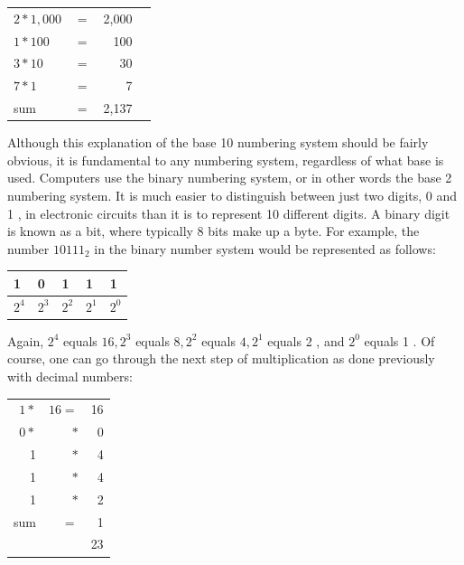 \documentclass[10pt]{book}
\begin{document}
\begin{center}
\begin{center}
\begin{center}
\begin{center}
\begin{center}
\begin{center}
\begin{tabular}{llrr}
$2 * 1,000$ & $=$ & 2,000 \\
$1 * 100$ & $=$ & 100 \\
$3 * 10$ & $=$ & 30 \\
$7 * 1$ & $=$ & 7 \\
\hline
sum & $=$ & 2,137 \\
\hline
\end{tabular}
\end{center}

Although this explanation of the base 10 numbering system should be fairly obvious, it is fundamental to any numbering system, regardless of what base is used. Computers use the binary numbering system, or in other words the base 2 numbering system. It is much easier to distinguish between just two digits, 0 and 1 , in electronic circuits than it is to represent 10 different digits. A binary digit is known as a bit, where typically 8 bits make up a byte. For example, the number $10111_{2}$ in the binary number system would be represented as follows:

\begin{center}
\begin{tabular}{|l|l|l|l|l|}
\hline
1 & 0 & 1 & 1 & 1 \\
\hline
$2^{4}$ & $2^{3}$ & $2^{2}$ & $2^{1}$ & $2^{0}$ \\
\hline
\end{tabular}
\end{center}

Again, $2^{4}$ equals $16,2^{3}$ equals $8,2^{2}$ equals $4,2^{1}$ equals 2 , and $2^{0}$ equals 1 . Of course, one can go through the next step of multiplication as done previously with decimal numbers:

\begin{center}
\begin{tabular}{rrr}
$1 *$ & $16=$ & 16 \\
$0 *$ & $*$ & 0 \\
1 & $*$ & 4 \\
1 & $*$ & 4 \\
1 & $*$ & 2 \\
\hline
sum & $=$ & 1 \\
\hline
 &  & 23 \\
\hline
\end{tabular}
\end{center}


\end{center}
\end{center}
\end{center}
\end{center}
\end{center}
\end{document}
